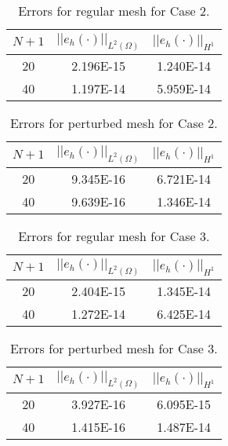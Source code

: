 \documentclass[a4paper, 12pt]{article}
\begin{document}
\begin{table}[!ht]
\caption{Errors for regular mesh for Case 2.}
\vspace{0.1in}
\centering
\begin{tabular}{|c|c|c|}
\hline
 $N+1$&  $||e_h(\cdot)||_{L^2(\Omega)}$ & $||e_h(\cdot)||_{H^1}$ \\
 \hline
     20  & 2.196E-15 & 1.240E-14 \\
     40  & 1.197E-14 & 5.959E-14 \\
\hline
\end{tabular}
\label{tab:C2o}
\end{table}

\begin{table}[!ht]
\caption{Errors for perturbed mesh for Case 2.}
\vspace{0.1in}
\centering
\begin{tabular}{|c|c|c|}
\hline
 $N+1$  & $||e_h(\cdot)||_{L^2(\Omega)}$ & $||e_h(\cdot)||_{H^1}$ \\
 \hline
     20  & 9.345E-16 & 6.721E-14 \\
     40  & 9.639E-16 & 1.346E-14 \\
\hline
\end{tabular}
\label{tab:C2p}
\end{table}

\begin{table}[!ht]
\caption{Errors for regular mesh for Case 3.}
\vspace{0.1in}
\centering
\begin{tabular}{|c|c|c|}
\hline
 $N+1$&  $||e_h(\cdot)||_{L^2(\Omega)}$ & $||e_h(\cdot)||_{H^1}$ \\
 \hline
     20  & 2.404E-15 & 1.345E-14 \\
     40  & 1.272E-14 & 6.425E-14 \\
\hline
\end{tabular}
\label{tab:C3o}
\end{table}

\begin{table}[!ht]
\caption{Errors for perturbed mesh for Case 3.}
\vspace{0.1in}
\centering
\begin{tabular}{|c|c|c|}
\hline
 $N+1$  & $||e_h(\cdot)||_{L^2(\Omega)}$ & $||e_h(\cdot)||_{H^1}$ \\
 \hline
     20  & 3.927E-16 & 6.095E-15 \\
     40  & 1.415E-16 & 1.487E-14 \\
\hline
\end{tabular}
\label{tab:C3p}
\end{table}
\end{document}
